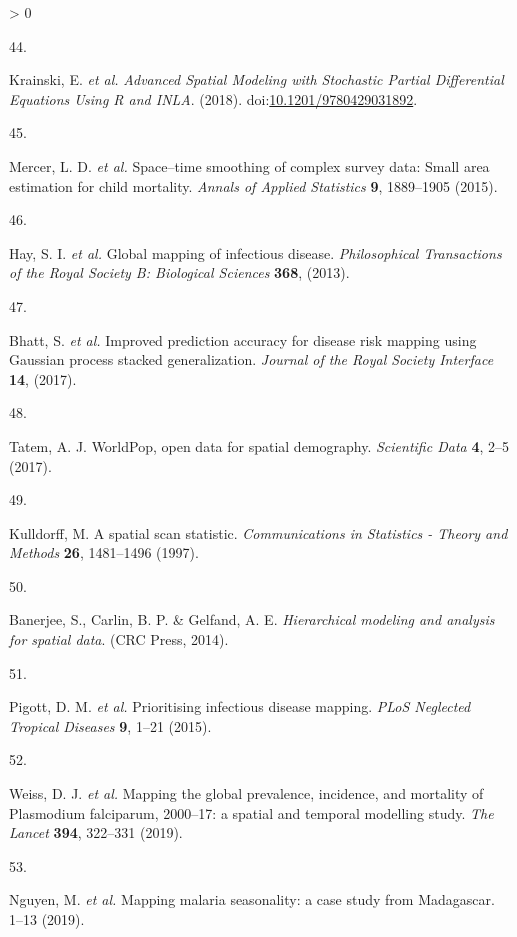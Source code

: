 \documentclass[
]{article}
\newlength{\cslhangindent}
\newlength{\csllabelwidth}
\newenvironment{CSLReferences}[2] %
 {%
  \setlength{\parindent}{0pt}
  \ifodd #1 \everypar{\setlength{\hangindent}{\cslhangindent}}\ignorespaces\fi
  \ifnum #2 > 0
  \setlength{\parskip}{#2\baselineskip}
  \fi
 }%
 {}
\newcommand{\CSLLeftMargin}[1]{\parbox[t]{\csllabelwidth}{#1}}
\newcommand{\CSLRightInline}[1]{\parbox[t]{\linewidth - \csllabelwidth}{#1}\break}
\begin{document}
\begin{CSLReferences}{0}{0}
\leavevmode\hypertarget{ref-Krainski2018}{}%
\CSLLeftMargin{44. }
\CSLRightInline{Krainski, E. \emph{et al.} \emph{{Advanced Spatial Modeling with Stochastic Partial Differential Equations Using R and INLA}}. (2018). doi:\href{https://doi.org/10.1201/9780429031892}{10.1201/9780429031892}.}

\leavevmode\hypertarget{ref-Mercer2015}{}%
\CSLLeftMargin{45. }
\CSLRightInline{Mercer, L. D. \emph{et al.} {Space--time smoothing of complex survey data: Small area estimation for child mortality}. \emph{Annals of Applied Statistics} \textbf{9}, 1889--1905 (2015).}

\leavevmode\hypertarget{ref-Hay2013}{}%
\CSLLeftMargin{46. }
\CSLRightInline{Hay, S. I. \emph{et al.} {Global mapping of infectious disease}. \emph{Philosophical Transactions of the Royal Society B: Biological Sciences} \textbf{368}, (2013).}

\leavevmode\hypertarget{ref-Bhatt2017}{}%
\CSLLeftMargin{47. }
\CSLRightInline{Bhatt, S. \emph{et al.} {Improved prediction accuracy for disease risk mapping using Gaussian process stacked generalization}. \emph{Journal of the Royal Society Interface} \textbf{14}, (2017).}

\leavevmode\hypertarget{ref-Tatem2017}{}%
\CSLLeftMargin{48. }
\CSLRightInline{Tatem, A. J. {WorldPop, open data for spatial demography}. \emph{Scientific Data} \textbf{4}, 2--5 (2017).}

\leavevmode\hypertarget{ref-Kulldorff1997}{}%
\CSLLeftMargin{49. }
\CSLRightInline{Kulldorff, M. {A spatial scan statistic}. \emph{Communications in Statistics - Theory and Methods} \textbf{26}, 1481--1496 (1997).}

\leavevmode\hypertarget{ref-Banerjee2014}{}%
\CSLLeftMargin{50. }
\CSLRightInline{Banerjee, S., Carlin, B. P. \& Gelfand, A. E. \emph{{Hierarchical modeling and analysis for spatial data}}. (CRC Press, 2014).}

\leavevmode\hypertarget{ref-Pigott2015}{}%
\CSLLeftMargin{51. }
\CSLRightInline{Pigott, D. M. \emph{et al.} {Prioritising infectious disease mapping}. \emph{PLoS Neglected Tropical Diseases} \textbf{9}, 1--21 (2015).}

\leavevmode\hypertarget{ref-Weiss2019}{}%
\CSLLeftMargin{52. }
\CSLRightInline{Weiss, D. J. \emph{et al.} {Mapping the global prevalence, incidence, and mortality of Plasmodium falciparum, 2000--17: a spatial and temporal modelling study}. \emph{The Lancet} \textbf{394}, 322--331 (2019).}

\leavevmode\hypertarget{ref-Nguyen2019}{}%
\CSLLeftMargin{53. }
\CSLRightInline{Nguyen, M. \emph{et al.} {Mapping malaria seasonality: a case study from Madagascar}. 1--13 (2019).}


\end{CSLReferences}
\end{document}
